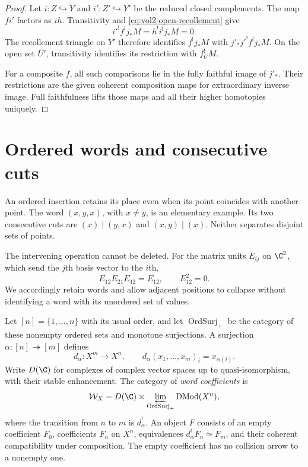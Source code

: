 \begin{proof}
Let $i:Z\hookrightarrow Y$ and $i':Z'\hookrightarrow Y'$
be the reduced closed complements. The map $fi'$ factors as $ih$.
Transitivity and \eqref{eq:vol2-open-recollement} give
\[
 i'^!f^!j_*M=h^!i^!j_*M=0.
\]
The recollement triangle on $Y'$ therefore identifies $f^!j_*M$
with $j'_*j'^!f^!j_*M$. On the open set $U'$, transitivity
identifies its restriction with $f_U^!M$.

For a composite $f$, all such comparisons lie in the fully faithful
image of $j'_*$. Their restrictions are the given coherent
composition maps for extraordinary inverse image. Full faithfulness
lifts those maps and all their higher homotopies uniquely.
\end{proof}

\section{Ordered words and consecutive cuts}
\label{sec:vol2-word-coefficients}

An ordered insertion retains its place even when its point coincides
with another point. The word $(x,y,x)$, with $x\ne y$, is an elementary
example. Its two consecutive cuts are $(x)\mid(y,x)$ and
$(x,y)\mid(x)$. Neither separates disjoint sets of points.

The intervening operation cannot be deleted. For the matrix units
$E_{ij}$ on $\C^2$, which send the $j$th basis vector to the $i$th,
\[
 E_{12}E_{21}E_{12}=E_{12},\qquad E_{12}^2=0.
\]
We accordingly retain words and allow adjacent positions to collapse
without identifying a word with its unordered set of values.

Let $[n]=\{1,\ldots,n\}$ with its usual order, and let
$\operatorname{OrdSurj}_+$ be the category of these nonempty ordered
sets and monotone surjections. A surjection
$\alpha:[n]\twoheadrightarrow[m]$ defines
\[
 d_\alpha:X^m\longrightarrow X^n,\qquad
 d_\alpha(x_1,\ldots,x_m)_i=x_{\alpha(i)}.
\]
Write $D(\C)$ for complexes of complex vector spaces up to
quasi-isomorphism, with their stable enhancement. The category of
\emph{word coefficients} is
\begin{equation}\label{eq:vol2-word-category}
 \mathcal W_X=D(\C)\times
   \varprojlim_{\operatorname{OrdSurj}_+}\operatorname{DMod}(X^n),
\end{equation}
where the transition from $n$ to $m$ is $d_\alpha^!$.
An object $F$ consists of an empty coefficient $F_0$, coefficients
$F_n$ on $X^n$, equivalences $d_\alpha^!F_n\simeq F_m$, and
their coherent compatibility under composition. The empty
coefficient has no collision arrow to a nonempty one.

